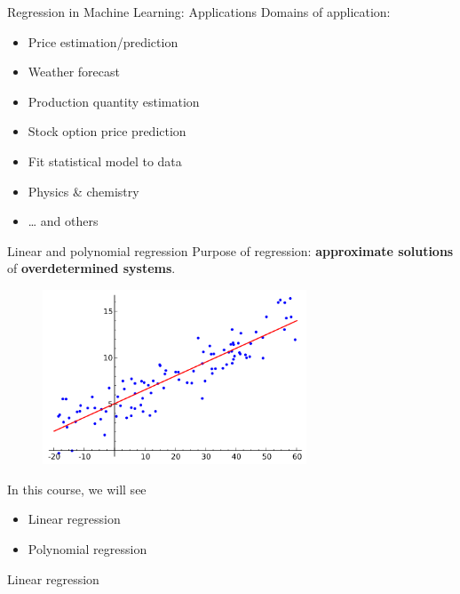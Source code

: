 \documentclass{beamer}
\begin{document}
\begin{frame}{Regression in Machine Learning: Applications}
Domains of application:
\vfill
\begin{itemize}
	\item Price estimation/prediction
\vfill
	\item Weather forecast
\vfill
	\item Production quantity estimation
\vfill
	\item Stock option price prediction
\vfill
	\item Fit statistical model to data
\vfill
	\item Physics \& chemistry
\vfill
	\item \ldots{} and others
\end{itemize}
\end{frame}
%
\begin{frame}{Linear and polynomial regression}
Purpose of regression: \textbf{approximate solutions} of \textbf{overdetermined systems}.
\vfill
\begin{figure}
\centering
\includegraphics[width=0.70\textwidth]{images/2d_regression.png}
\end{figure}
\vfill
In this course, we will see
\begin{itemize}
	\item Linear regression
	\item Polynomial regression
\end{itemize}
\end{frame}
%
\begin{frame}
\begin{center}
\Huge{Linear regression}
\end{center}
\end{frame}
%
\end{document}
